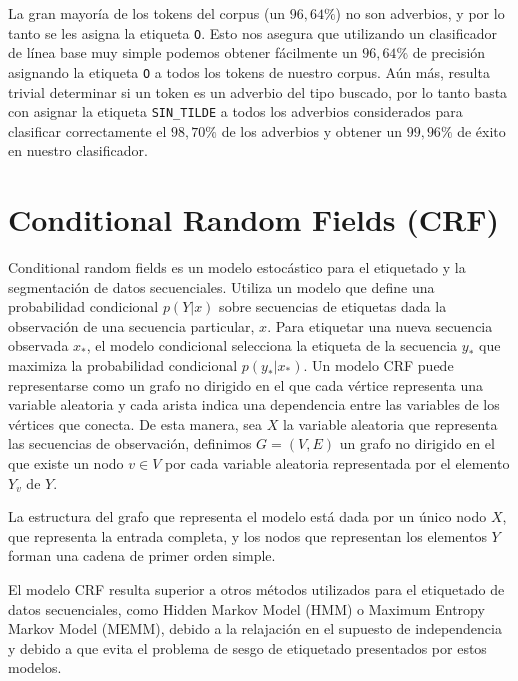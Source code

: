 \documentclass[runningheads,a4paper]{llncs}
\begin{document}
La gran mayoría de los tokens del corpus (un $96,64\%$)  no son adverbios, y por lo tanto se les asigna la etiqueta \texttt{\small O}. Esto nos asegura que utilizando un clasificador de línea base muy simple podemos obtener fácilmente un $96,64\%$ de precisión asignando la etiqueta \texttt{\small O} a todos los tokens de nuestro corpus. A\'un m\'as, resulta trivial determinar si un token es un adverbio del tipo buscado, por lo tanto basta con asignar la etiqueta \texttt{\small SIN\_TILDE} a todos los adverbios considerados para clasificar correctamente el $98,70\%$ de los adverbios y obtener un $99,96\%$ de \'exito en nuestro clasificador.


\section{Conditional Random Fields (CRF)}
\label{sec:CRF}

Conditional random fields\cite{LAFFERTY01} es un modelo estocástico para el etiquetado y la segmentación de datos secuenciales. Utiliza un modelo que define una probabilidad condicional $p(Y|x)$ sobre secuencias de etiquetas dada la observación de una secuencia particular, $x$. Para etiquetar una nueva secuencia observada $x_*$, el modelo condicional selecciona la etiqueta de la secuencia $y_*$ que maximiza la probabilidad condicional $p(y_*|x_*)$. Un modelo CRF puede representarse como un grafo no dirigido en el que cada vértice representa una variable aleatoria y cada arista indica una dependencia entre las variables de los vértices que conecta. De esta manera, sea $X$ la variable aleatoria que representa las secuencias de observaci\'on, definimos $G=(V,E)$ un grafo no dirigido en el que existe un nodo $v \in V$ por cada variable aleatoria representada por el elemento $Y_v$ de $Y$. 

La estructura del grafo que representa el modelo está dada por un único nodo $X$, que representa la entrada completa, y los nodos que representan los elementos $Y$ forman una cadena de primer orden simple. %


El modelo CRF resulta superior a otros métodos utilizados para el etiquetado de datos secuenciales, como Hidden Markov Model (HMM) o Maximum Entropy Markov Model (MEMM), debido a la relajación en el supuesto de independencia y debido a que evita el problema de sesgo de etiquetado presentados por estos modelos\cite{WALLACH04}.
\end{document}
